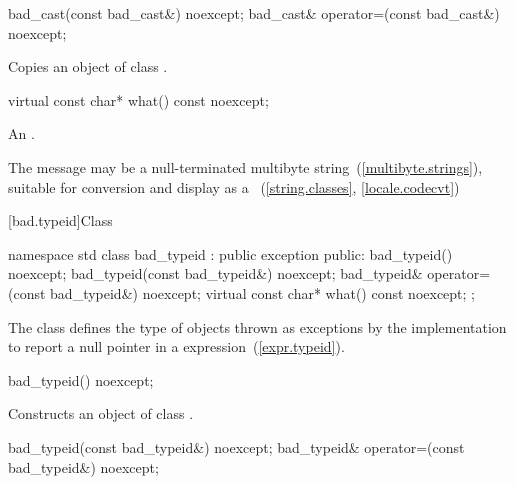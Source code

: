 %
%
\begin{itemdecl}
bad_cast(const bad_cast&) noexcept;
bad_cast& operator=(const bad_cast&) noexcept;
\end{itemdecl}

\begin{itemdescr}
\pnum
\effects
Copies an object of class
.
\end{itemdescr}

%
\begin{itemdecl}
virtual const char* what() const noexcept;
\end{itemdecl}

\begin{itemdescr}
\pnum
\returns
An  \ntbs.%

\pnum
\remarks
The message may be a null-terminated multibyte string~(\ref{multibyte.strings}),
suitable for conversion and display as a
~(\ref{string.classes}, \ref{locale.codecvt})
\end{itemdescr}

[bad.typeid]{Class }

%
\begin{codeblock}
namespace std {
  class bad_typeid : public exception {
  public:
    bad_typeid() noexcept;
    bad_typeid(const bad_typeid&) noexcept;
    bad_typeid& operator=(const bad_typeid&) noexcept;
    virtual const char* what() const noexcept;
  };
}
\end{codeblock}

\pnum
The class
defines the type of objects
thrown as exceptions by the implementation to report a null pointer
in a
expression~(\ref{expr.typeid}).

%
\begin{itemdecl}
bad_typeid() noexcept;
\end{itemdecl}

\begin{itemdescr}
\pnum
\effects
Constructs an object of class
.
\end{itemdescr}

%
%
\begin{itemdecl}
bad_typeid(const bad_typeid&) noexcept;
bad_typeid& operator=(const bad_typeid&) noexcept;
\end{itemdecl}

